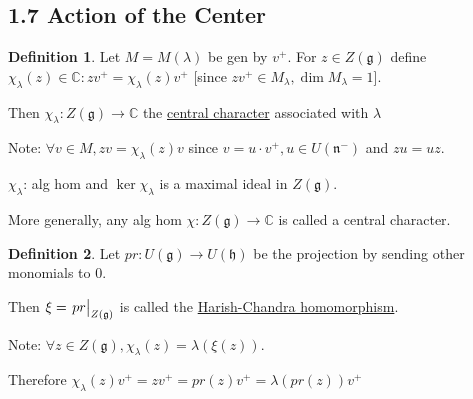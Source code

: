 \documentclass{article}
\theoremstyle{definition}
\newtheorem*{definition}{Definition}
\begin{document}
    \subsection*{1.7 Action of the Center}

    \begin{definition}
        Let \(M = M(\lambda)\) be gen by \(v^+\). For \(z\in Z(\mathfrak{g})\) define \(\chi_\lambda(z) \in \mathbb{C}: z v^+ = \chi_\lambda(z)v^+\) [since \(zv^+\in M_\lambda, \dim M_\lambda = 1\)].
        
        Then \(\chi_\lambda: Z(\mathfrak{g}) \to \mathbb{C}\) the \underline{central character} associated with \(\lambda\)  
    \end{definition}

    Note: \(\forall v\in M, z v = \chi_\lambda (z) v\) since \(v = u \cdot v^+, u\in U(\mathfrak{n}^-)\) and \(zu = uz\).

    \(\chi_\lambda\): alg hom and \(\ker \chi_\lambda\) is a maximal ideal in \(Z(\mathfrak{g})\).
    
    More generally, any alg  hom \(\chi: Z(\mathfrak{g}) \to \mathbb{C}\) is called a central character.
    
    \begin{definition}
        Let \(pr: U(\mathfrak{g}) \to U(\mathfrak{h})\) be the projection by sending other monomials to \(0\).
        
        Then \(\xi = \eval{pr}_{Z(\mathfrak{g})}\) is called the \underline{Harish-Chandra homomorphism}.  
    \end{definition}

    Note: \(\forall z\in Z(\mathfrak{g}), \chi_\lambda(z) = \lambda(\xi(z))\).
    
    Therefore \(\chi_\lambda(z) v^+ = z v^+ = pr(z) v^+ = \lambda(pr(z))v^+\)
\end{document}
